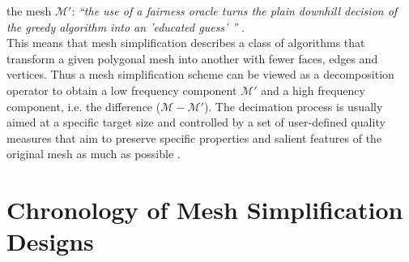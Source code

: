 the mesh $\mathcal{M'}$: \textit{``the use of a fairness oracle turns the plain downhill decision of the greedy algorithm into an 'educated guess' ''} \citep[][p.46]{Kobbelt1998}.\\
This means that mesh simplification describes a class of algorithms that transform a given polygonal mesh into another with fewer faces, edges and vertices.
Thus a mesh simplification scheme can be viewed as a decomposition operator to obtain a low frequency component $\mathcal{M'}$ and a high frequency component, i.e. the difference ($\mathcal{M} - \mathcal{M'}$).
The decimation process is usually aimed at a specific target size and controlled by a set of user-defined quality measures that aim to preserve specific properties and salient features of the original mesh as much as possible \citep[][cf. pp.9-10]{Shene2005}.

\section{Chronology of Mesh Simplification Designs}
\label{simplification2}

